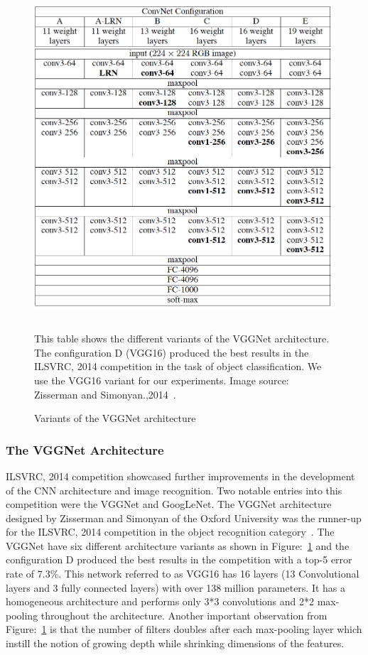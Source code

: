 \begin{figure}[t]
\centering
\includegraphics[width=12cm, height=12cm]{Figures/VGG16_Network}
\caption{Variants of the VGGNet architecture}
\label{VGG16_types}
This table shows the different variants of the VGGNet architecture. The configuration D (VGG16) produced the best results in the ILSVRC, 2014 competition in the task of object classification. We use the VGG16 variant for our experiments. Image source: Zisserman and Simonyan.,2014~\cite{VGG16}.
\end{figure}


\subsubsection{The VGGNet Architecture}
ILSVRC, 2014 competition showcased further improvements in the development of the CNN architecture and image recognition. Two notable entries into this competition were the VGGNet and GoogLeNet. The VGGNet architecture designed by Zisserman and Simonyan of the Oxford University was the runner-up for the ILSVRC, 2014 competition in the object recognition category~\cite{VGG16}. The VGGNet have six different architecture variants as shown in Figure:~\ref{VGG16_types} and the configuration D produced the best results in the competition with a top-5 error rate of 7.3\%. This network referred to as VGG16 has 16 layers (13 Convolutional layers and 3 fully connected layers) with over 138 million parameters. It has a homogeneous architecture and performs only 3*3 convolutions and 2*2 max-pooling throughout the architecture. Another important observation from Figure:~\ref{VGG16_types} is that the number of filters doubles after each max-pooling layer which instill the notion of growing depth while shrinking dimensions of the features.


